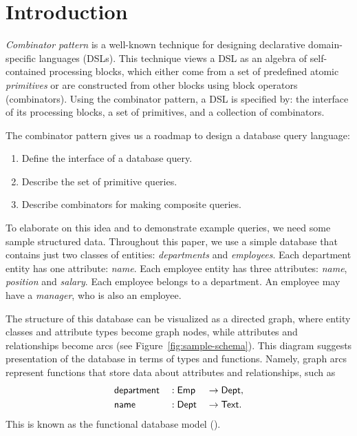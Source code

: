 
\section{Introduction}
\label{sec:introduction}

\emph{Combinator pattern} is a well-known technique for designing declarative
domain-specific languages (DSLs). This technique views a DSL as an algebra of
self-con\-tained processing blocks, which either come from a set of predefined
atomic \emph{primitives} or are constructed from other blocks using block
operators (combinators).  Using the combinator pattern, a DSL is specified by:
the interface of its processing blocks, a set of primitives, and a collection
of combinators.

The combinator pattern gives us a roadmap to design a database query language:

\begin{enumerate}
\item
Define the interface of a database query.

\item
Describe the set of primitive queries.

\item
Describe combinators for making composite queries.
\end{enumerate}

To elaborate on this idea and to demonstrate example queries, we need some
sample structured data.  Throughout this paper, we use a simple database that
contains just two classes of entities: \emph{departments} and \emph{employees}.
Each department entity has one attribute: \emph{name}.  Each employee entity
has three attributes: \emph{name}, \emph{position} and \emph{salary}.  Each
employee belongs to a department.  An employee may have a \emph{manager}, who
is also an employee.

The structure of this database can be visualized as a directed graph, where entity
classes and attribute types become graph nodes, while attributes and relationships
become arcs (see Figure~\ref{fig:sample-schema}).  This diagram
suggests presentation of the database in terms of types and functions.
Namely, graph arcs represent functions that store data about attributes and
relationships, such as
\begin{alignat*}{3}
    & \textup{\textsf{department}} && : \textup{\textsf{Emp}} && \to \textup{\textsf{Dept}}, \\
    & \textup{\textsf{name}} && : \textup{\textsf{Dept}} && \to \textup{\textsf{Text}}.
\end{alignat*}
This is known as the functional database model (\cite{Kerschberg1976}).

